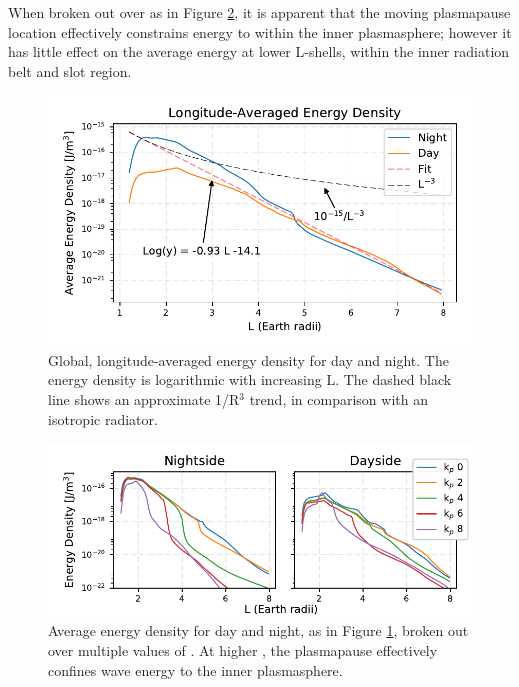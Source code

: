 When broken out over \kp{} as in Figure \ref{fig:energy_density_vs_L_multiple_kp}, it is apparent that the moving plasmapause location effectively constrains energy to within the inner plasmasphere; however it has little effect on the average energy at lower L-shells, within the inner radiation belt and slot region.



\begin{figure}[h!]
\begin{center}
\includegraphics{figures/density_vs_L_with_fit.pdf}
\caption[Average energy density vs L, longitude-averaged]{Global, longitude-averaged energy density for day and night. The energy density is logarithmic with increasing L. The dashed black line shows an approximate 1/R$^3$ trend, in comparison with an isotropic radiator.}
\label{fig:energy_density_vs_L_trendline}
\end{center}
\end{figure}

\begin{figure}[h!]
\begin{center}
\includegraphics{figures/density_vs_L_multiple_kp.pdf}
\caption[Average energy density vs L for multiple \kp{}]{Average energy density for day and night, as in Figure \ref{fig:energy_density_vs_L_trendline}, broken out over multiple values of \kp{}. At higher \kp{}, the plasmapause effectively confines wave energy to the inner plasmasphere.}
\label{fig:energy_density_vs_L_multiple_kp}
\end{center}
\end{figure}

